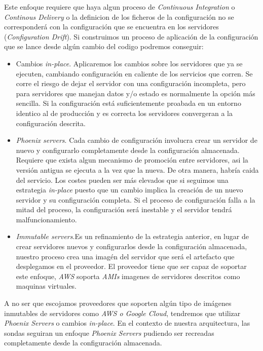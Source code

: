 Este enfoque requiere que haya algun proceso de \emph{Continuous Integration} o \emph{Continous Delivery} o la definicion de los ficheros
de la configuración no se corresponderá con la configuración que se encuentra en los servidores (\emph{Configuration Drift}). Si construimos 
un proceso de aplicación de la configuración que se lance desde algún cambio del codigo podremos conseguir:

\begin{itemize}
    \item Cambios \emph{in-place}. Aplicaremos los cambios sobre los servidores que ya se ejecuten, cambiando configuración en caliente de los servicios que corren.
    Se corre el riesgo de dejar el servidor con una configuración incompleta, pero para servidores que manejan datos y/o estado es normalmente la opción más sencilla. Si la configuración
    está suficientemente proabada en un entorno identico al de producción y es correcta los servidores convergeran a la configuración descrita. 
    \item \emph{Phoenix servers}. Cada cambio de configuración involucra crear un servidor de nuevo y configurarlo completamente desde la configuración almacenada.
    Requiere que exista algun mecanismo de promoción entre servidores, asi la versión antigua se ejecuta a la vez que la nueva. De otra manera, habría caida del servicio. Los costes pueden ser más elevados que si seguimos una estrategia \emph{in-place}
    puesto que un cambio implica la creación de un nuevo servidor y su configuración completa. Si el proceso de configuración falla a la mitad del proceso, la configuración será inestable y el servidor tendrá malfuncionamiento.
    \item \emph{Immutable servers}.Es un refinamiento de la estrategia anterior, en lugar de crear servidores nuevos y configurarlos desde la configuración almacenada, nuestro proceso crea una imagén del servidor que será el artefacto que desplegamos en el proveedor.
    El proveedor tiene que ser capaz de soportar este enfoque, \emph{AWS} soporta \emph{AMIs} imagenes de servidores descritos como maquinas virtuales.  
\end{itemize}

A no ser que escojamos proveedores que soporten algún tipo de imágenes inmutables de servidores como \emph{AWS o Google Cloud}, tendremos que utilizar \emph{Phoenix Servers} o cambios \emph{in-place}.
En el contexto de nuestra arquitectura, las sondas seguiran un enfoque \emph{Phoenix Servers} pudiendo ser recreadas completamente desde la configuración almacenada.

